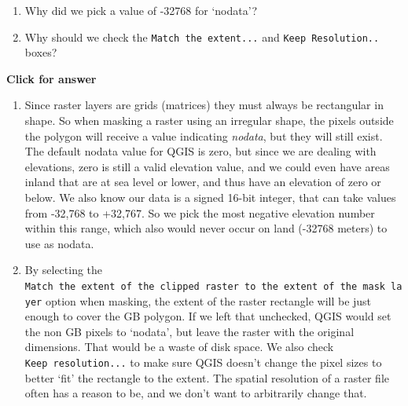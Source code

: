 \documentclass[
  letterpaper,
  DIV=11,
  numbers=noendperiod]{scrreprt}
\begin{document}
\begin{tcolorbox}[enhanced jigsaw, breakable, toptitle=1mm, colback=white, left=2mm, leftrule=.75mm, titlerule=0mm, colframe=quarto-callout-important-color-frame, opacityback=0, title=\textcolor{quarto-callout-important-color}{\faExclamation}\hspace{0.5em}{Stop and Think}, toprule=.15mm, opacitybacktitle=0.6, bottomtitle=1mm, colbacktitle=quarto-callout-important-color!10!white, bottomrule=.15mm, coltitle=black, rightrule=.15mm, arc=.35mm]

\begin{enumerate}
\def\labelenumi{\alph{enumi})}
\item
  Why did we pick a value of -32768 for `nodata'?
\item
  Why should we check the \texttt{Match\ the\ extent...} and
  \texttt{Keep\ Resolution..} boxes?
\end{enumerate}

\end{tcolorbox}

\begin{tcolorbox}[enhanced jigsaw, leftrule=.75mm, colframe=quarto-callout-important-color-frame, breakable, toprule=.15mm, bottomrule=.15mm, arc=.35mm, rightrule=.15mm, opacityback=0, colback=white, left=2mm]

\vspace{-3mm}\textbf{Click for answer}\vspace{3mm}

\begin{enumerate}
\def\labelenumi{\alph{enumi})}
\item
  Since raster layers are grids (matrices) they must always be
  rectangular in shape. So when masking a raster using an irregular
  shape, the pixels outside the polygon will receive a value indicating
  \emph{nodata}, but they will still exist. The default nodata value for
  QGIS is zero, but since we are dealing with elevations, zero is still
  a valid elevation value, and we could even have areas inland that are
  at sea level or lower, and thus have an elevation of zero or below. We
  also know our data is a signed 16-bit integer, that can take values
  from -32,768 to +32,767. So we pick the most negative elevation number
  within this range, which also would never occur on land (-32768
  meters) to use as nodata.
\item
  By selecting the
  \texttt{Match\ the\ extent\ of\ the\ clipped\ raster\ to\ the\ extent\ of\ the\ mask\ layer}
  option when masking, the extent of the raster rectangle will be just
  enough to cover the GB polygon. If we left that unchecked, QGIS would
  set the non GB pixels to `nodata', but leave the raster with the
  original dimensions. That would be a waste of disk space. We also
  check \texttt{Keep\ resolution...} to make sure QGIS doesn't change
  the pixel sizes to better `fit' the rectangle to the extent. The
  spatial resolution of a raster file often has a reason to be, and we
  don't want to arbitrarily change that.
\end{enumerate}

\end{tcolorbox}
\end{document}
